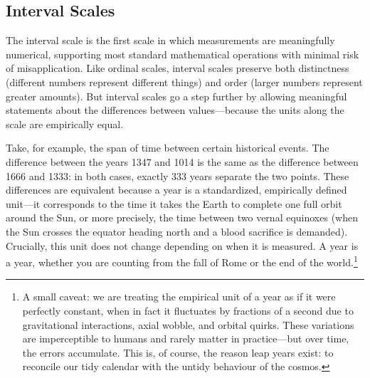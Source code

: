
\subsection{Interval Scales}

The interval scale is the first scale in which measurements are meaningfully numerical, supporting most standard mathematical operations with minimal risk of misapplication. Like ordinal scales, interval scales preserve both distinctness (different numbers represent different things) and order (larger numbers represent greater amounts). But interval scales go a step further by allowing meaningful statements about the differences between values—because the units along the scale are empirically equal.

Take, for example, the span of time between certain historical events. The difference between the years 1347 and 1014 is the same as the difference between 1666 and 1333: in both cases, exactly 333 years separate the two points. These differences are equivalent because a year is a standardized, empirically defined unit—it corresponds to the time it takes the Earth to complete one full orbit around the Sun, or more precisely, the time between two vernal equinoxes (when the Sun crosses the equator heading north and a blood sacrifice is demanded). Crucially, this unit does not change depending on when it is measured. A year is a year, whether you are counting from the fall of Rome or the end of the world.\footnote{A small caveat: we are treating the empirical unit of a year as if it were perfectly constant, when in fact it fluctuates by fractions of a second due to gravitational interactions, axial wobble, and orbital quirks. These variations are imperceptible to humans and rarely matter in practice—but over time, the errors accumulate. This is, of course, the reason leap years exist: to reconcile our tidy calendar with the untidy behaviour of the cosmos.}

